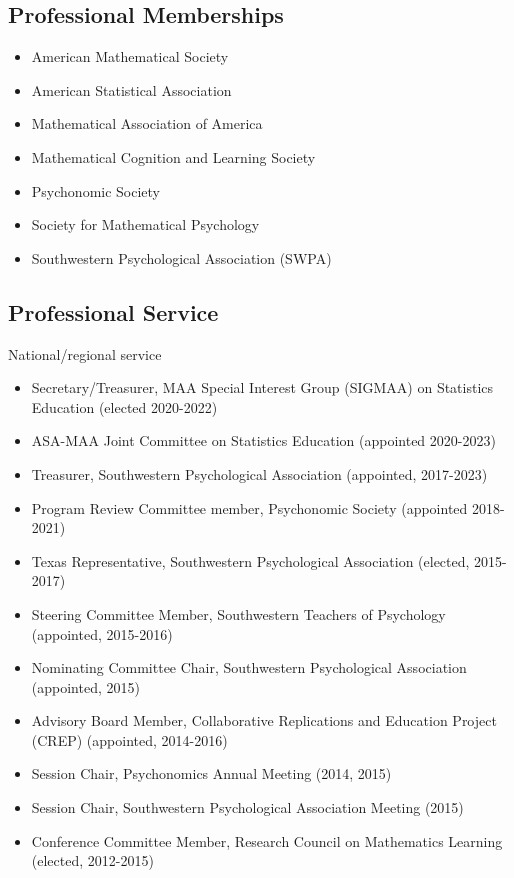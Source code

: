\documentclass[article,10pt]{article}
\begin{document}
\subsection*{Professional Memberships}
\label{sec:org2c59d42}
\begin{itemize}
\item American Mathematical Society
\item American Statistical Association
\item Mathematical Association of America
\item Mathematical Cognition and Learning Society
\item Psychonomic Society
\item Society for Mathematical Psychology
\item Southwestern Psychological Association (SWPA)
\end{itemize}

\subsection*{Professional Service}
\label{sec:orga6f1458}

National/regional service 

\begin{itemize}
\item Secretary/Treasurer, MAA Special Interest Group (SIGMAA) on Statistics Education (elected 2020-2022)
\item ASA-MAA Joint Committee on Statistics Education (appointed 2020-2023)
\item Treasurer, Southwestern Psychological Association (appointed, 2017-2023)
\item Program Review Committee member, Psychonomic Society (appointed 2018-2021)
\item Texas Representative, Southwestern Psychological Association (elected, 2015-2017)
\item Steering Committee Member, Southwestern Teachers of Psychology (appointed, 2015-2016)
\item Nominating Committee Chair, Southwestern Psychological Association (appointed, 2015)
\item Advisory Board Member, Collaborative Replications and Education Project (CREP) (appointed, 2014-2016)
\item Session Chair, Psychonomics Annual Meeting (2014, 2015)
\item Session Chair, Southwestern Psychological Association Meeting (2015)
\item Conference Committee Member, Research Council on Mathematics Learning (elected, 2012-2015)
\end{itemize}
\end{document}

